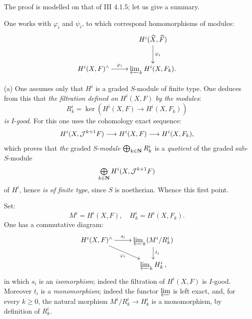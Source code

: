 The proof is modelled on that of \EGA III 4.1.5; let us give a summary.

One works with $\varphi_i$ and $\psi_i$, to which correspond homomorphisms of modules:
\begin{equation} \label{eq:IX.1.16}
\begin{array}{c}
\xymatrix{ & H^i(\hat X, \hat F) \ar[d]^-{\psi_i} \\
H^i(X, F)^{\wedge}\ar[r]^-{\varphi_i}& \varprojlim_k H^i(X, F_k).
}
\end{array}
\end{equation}

\indent\textup{(a)} One assumes only that $H^i$ is a graded $S$-module of finite type. One deduces from this that \emph{the filtration defined on} $H^i(X, F)$ \emph{by the modules}:
\begin{equation} \label{eq:IX.1.17} R^i_k=\ker(H^i(X, F)\to H^i(X, F_k))
\end{equation}
\emph{is} $I$-\emph{good}. For this one uses the cohomology exact sequence:
\begin{equation} \label{eq:IX.1.18} H^i(X, {\Jb}^{k+1}F)\to H^i(X, F)\to H^i(X, F_k),
\end{equation}
which proves that \emph{the} graded $S$-\emph{module} $\bigoplus_{k \in \mathbf{N}} R_k^i$ is a \emph{quotient} of the graded sub-$S$-module
\begin{equation*}
\mathop{\textstyle\bigoplus}\limits_{k \in \mathbf{N}}H^i(X, {\mathcal{J}}^{k+1}F)
\end{equation*}
of $H^i$, hence \emph{is of finite type}, since $S$ is noetherian. Whence this first point.

Set:
\begin{equation} \label{eq:IX.1.19}
M^i=H^i(X, F), \quad H^i_k=H^i(X, F_k).
\end{equation}
%
One has a commutative diagram:
\begin{equation} \label{eq:IX.1.20}
\begin{array}{c}
\xymatrix@R=6mm{ H^i(X, F)^{\wedge} \ar[r]^-{s_i}\ar[dr]_{\varphi_i} &\varprojlim_{k}(M^i/R^i_k)\ar[d]^{t_i} \\
&\varprojlim_{k}H^i_k\,,
}
\end{array}
\end{equation}
in which $s_i$ is an \emph{isomorphism}; indeed the filtration of $H^i(X, F)$ is $I$-good. Moreover $t_i$ is a \emph{monomorphism}; indeed the functor $\varprojlim$ is left exact, and, for every $k\geq 0$, the natural morphism $M^i/R^i_k \to H^i_k$ is a monomorphism, by definition of $R^i_k$.

